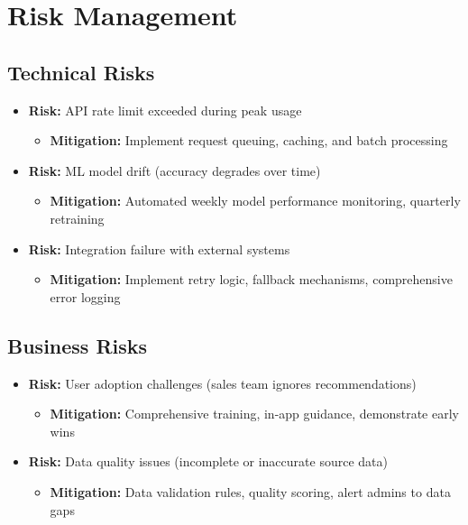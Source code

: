 \documentclass[12pt,a4paper]{article}
\begin{document}
\section{Risk Management}

\subsection{Technical Risks}
\begin{itemize}
    \item \textbf{Risk:} API rate limit exceeded during peak usage
    \begin{itemize}
        \item \textbf{Mitigation:} Implement request queuing, caching, and batch processing
    \end{itemize}
    \item \textbf{Risk:} ML model drift (accuracy degrades over time)
    \begin{itemize}
        \item \textbf{Mitigation:} Automated weekly model performance monitoring, quarterly retraining
    \end{itemize}
    \item \textbf{Risk:} Integration failure with external systems
    \begin{itemize}
        \item \textbf{Mitigation:} Implement retry logic, fallback mechanisms, comprehensive error logging
    \end{itemize}
\end{itemize}

\subsection{Business Risks}
\begin{itemize}
    \item \textbf{Risk:} User adoption challenges (sales team ignores recommendations)
    \begin{itemize}
        \item \textbf{Mitigation:} Comprehensive training, in-app guidance, demonstrate early wins
    \end{itemize}
    \item \textbf{Risk:} Data quality issues (incomplete or inaccurate source data)
    \begin{itemize}
        \item \textbf{Mitigation:} Data validation rules, quality scoring, alert admins to data gaps
    \end{itemize}
\end{itemize}
\end{document}

